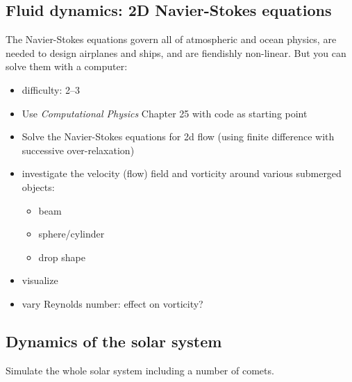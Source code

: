\documentclass[letterpaper]{scrartcl}
\begin{document}
\subsection{Fluid dynamics: 2D Navier-Stokes equations}

The Navier-Stokes equations govern all of atmospheric and ocean
physics, are needed to design airplanes and ships, and are fiendishly
non-linear. But you can solve them with a computer:

\begin{itemize}
\item difficulty: 2--3
\item Use \emph{Computational Physics} Chapter 25 with code as
  starting point
\item Solve the Navier-Stokes equations for 2d flow (using finite
  difference with successive over-relaxation)
\item investigate the velocity (flow) field and vorticity around various submerged
  objects: 
  \begin{itemize}
  \item beam
  \item sphere/cylinder
  \item drop shape
  \end{itemize}
\item visualize
\item vary Reynolds number: effect on vorticity?
\end{itemize}



\subsection{Dynamics of the solar system}

Simulate the whole solar system including a number of comets.
\end{document}
